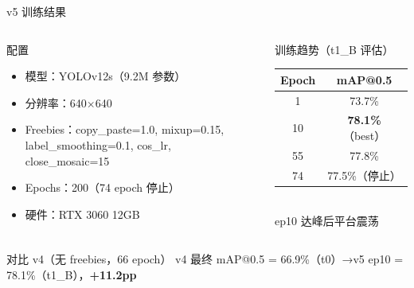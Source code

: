 \documentclass[aspectratio=169, 10pt]{beamer}
\begin{document}
\begin{frame}{v5 训练结果}
  \begin{columns}[T]
    \begin{block}{配置}
      \begin{itemize}
        \item 模型：YOLOv12s（9.2M 参数）
        \item 分辨率：640$\times$640
        \item Freebies：copy\_paste=1.0, mixup=0.15, \\
              label\_smoothing=0.1, cos\_lr, close\_mosaic=15
        \item Epochs：200（74 epoch 停止）
        \item 硬件：RTX 3060 12GB
      \end{itemize}
    \end{block}
    \begin{block}{训练趋势（t1\_B 评估）}
      \begin{tabular}{cc}
        \toprule
        Epoch & mAP@0.5 \\
        \midrule
        1 & 73.7\% \\
        10 & \textbf{78.1\%}（best） \\
        55 & 77.8\% \\
        74 & 77.5\%（停止） \\
        \bottomrule
      \end{tabular}
      \vspace{0em}\\
      \tiny ep10 达峰后平台震荡
    \end{block}
  \end{columns}
  \vspace{0em}
  \begin{block}{对比 v4（无 freebies，66 epoch）}
    v4 最终 mAP@0.5 = 66.9\%（t0）\quad→\quad v5 ep10 = 78.1\%（t1\_B），\textbf{+11.2pp}
  \end{block}
\end{frame}
\end{document}
